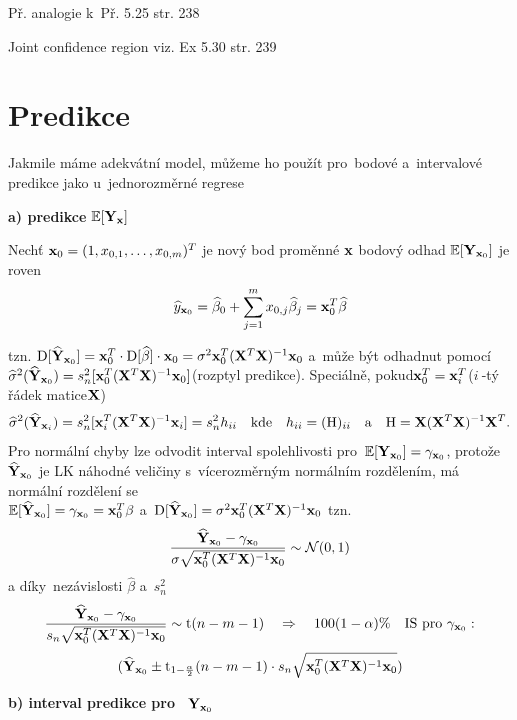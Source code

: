Př. analogie k~Př. 5.25 str. 238

\begin{remark}
	Joint confidence region viz. Ex 5.30 str. 239
\end{remark}



\section{Predikce}
Jakmile máme adekvátní model, můžeme ho použít pro~bodové a~intervalové predikce jako u~jednorozměrné regrese

\textbf{ a) predikce} $\mathbb{E} [\mathbf{Y}_{\mathbf{x}}]$

Nechť $\mathbf{x}_0 = (1, x_{0,1},\dots, x_{0,m})^T$ je nový bod proměnné $\mathbf{x}$ bodový odhad $\mathbb{E} [\mathbf{Y}_{\mathbf{x}_0}]$ je roven
 $$
 \widehat{y}_{\mathbf{x}_0} = \widehat{\beta}_0 + \sum_{j = 1}^m x_{0,j} \widehat{\beta}_j = \mathbf{x}_0^T \widehat{\beta}
 $$

tzn. $\mathrm{D} [\widehat{\mathbf{Y}}_{\mathbf{x}_0}] = \mathbf{x}_0^T \cdot \mathrm{D} [\widehat{\beta}] \cdot \mathbf{x}_0 = \sigma^2 \mathbf{x}_0^T(\mathbf{X}^T \mathbf{X})^{-1} \mathbf{x}_0$ a~může být odhadnut pomocí \\
 $
 \widehat{\sigma}^2(\widehat{\mathbf{Y}}_{\mathbf{x}_0}) = s_n^2 [\mathbf{x}_0^T(\mathbf{X}^T \mathbf{X})^{-1} \mathbf{x}_0] $(rozptyl predikce). Speciálně, pokud$ \mathbf{x}_0^T = \mathbf{x}_i^T $($ i~$-tý řádek matice$ \mathbf{X} $)
 $$
  \widehat{\sigma}^2(\widehat{\mathbf{Y}}_{\mathbf{x}_i}) = s_n^2 [\mathbf{x}_i^T(\mathbf{X}^T \mathbf{X})^{-1} \mathbf{x}_i] = s_n^2 h_{ii} \quad \text{kde} \quad h_{ii} = (\text{H})_{ii} \quad \text{a} \quad \text{H} = \mathbf{X} (\mathbf{X}^T  \mathbf{X})^{-1} \mathbf{X}^T.
 $$
Pro normální chyby lze odvodit interval spolehlivosti pro~$\mathbb{E} [\mathbf{Y}_{\mathbf{x}_0}] = \gamma_{\mathbf{x}_0}$, protože $\widehat{\mathbf{Y}}_{\mathbf{x}_0}$ je LK náhodné veličiny s~vícerozměrným normálním rozdělením, má normální rozdělení se~\\ $\mathbb{E} [\widehat{\mathbf{Y}}_{\mathbf{x}_0}] = \gamma_{\mathbf{x}_0} = \mathbf{x}_0^T \beta$ a~$\mathrm{D} [\widehat{\mathbf{Y}}_{\mathbf{x}_0}] = \sigma^2 \mathbf{x}_0^T(\mathbf{X}^T \mathbf{X})^{-1} \mathbf{x}_0$
tzn.
 $$
\frac{\widehat{\mathbf{Y}}_{\mathbf{x}_0} - \gamma_{\mathbf{x}_0}}{\sigma \sqrt{\mathbf{x}_0^T(\mathbf{X}^T \mathbf{X})^{-1} \mathbf{x}_0}} \sim \mathcal{N}(0,1)
 $$
a díky~nezávislosti $\widehat{\beta}$ a~$s_n^2$
 $$
 \frac{\widehat{\mathbf{Y}}_{\mathbf{x}_0} - \gamma_{\mathbf{x}_0}}{s_n \sqrt{\mathbf{x}_0^T(\mathbf{X}^T \mathbf{X})^{-1} \mathbf{x}_0}} \sim \mathrm{t}(n-m-1) \quad \Rightarrow \quad 100(1 - \alpha) \% \quad \text{IS pro~} \gamma_{\mathbf{x}_0}:
 $$
 $$
   (\widehat{\mathbf{Y}}_{\mathbf{x}_0} \pm \mathrm{t}_{1-\frac{\alpha}{2}}(n-m-1) \cdot s_n \sqrt{\mathbf{x}_0^T(\mathbf{X}^T \mathbf{X})^{-1} \mathbf{x}_0})
 $$

\textbf{ b) interval predikce pro~} $\mathbf{Y}_{\mathbf{x}_0}$

